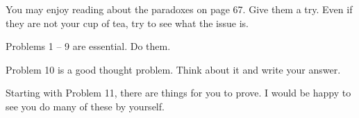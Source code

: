 You may enjoy reading about the paradoxes on page 67.
Give them a try.
Even if they are not your cup of tea, try to see what the issue is.

Problems 1 -- 9 are essential.  Do them.

Problem 10 is a good thought problem.  Think about it and write your answer.

Starting with Problem 11, there are things for you to prove.
I would be happy to see you do many of these by yourself.


\vfill          %
